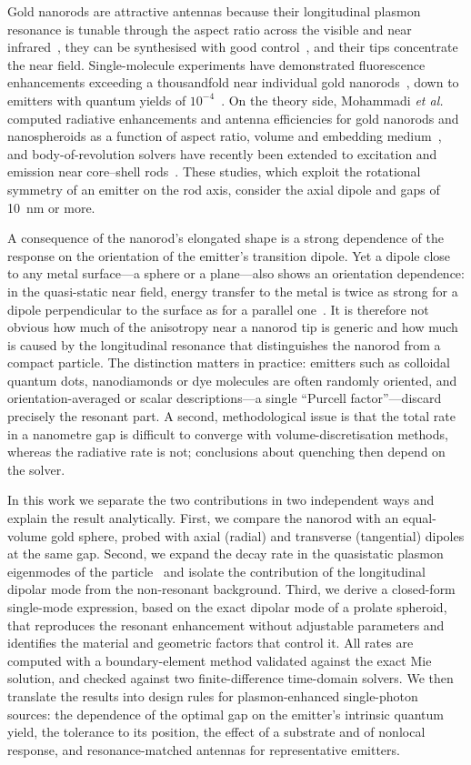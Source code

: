 \documentclass[11pt,a4paper]{article}
\begin{document}
Gold nanorods are attractive antennas because their longitudinal plasmon resonance is tunable through the
aspect ratio across the visible and near infrared~\cite{ni2008,sonnichsen}, they can be synthesised with good
control~\cite{nikoobakht}, and their tips concentrate the near field. Single-molecule experiments have
demonstrated fluorescence enhancements exceeding a thousandfold near individual gold nanorods~\cite{yuan,khatua},
down to emitters with quantum yields of $10^{-4}$~\cite{lu2020}. On the theory side, Mohammadi \emph{et al.}
computed radiative enhancements and antenna efficiencies for gold nanorods and nanospheroids as a function of
aspect ratio, volume and embedding medium~\cite{mohammadi,mohammadi2009}, and body-of-revolution solvers have
recently been extended to excitation and emission near core--shell rods~\cite{ugwuoke2026}. These studies, which
exploit the rotational symmetry of an emitter on the rod axis, consider the axial dipole and gaps of
\SI{10}{nm} or more.

A consequence of the nanorod's elongated shape is a strong dependence of the response on the orientation of the
emitter's transition dipole. Yet a dipole close to any metal surface---a sphere or a plane---also shows an
orientation dependence: in the quasi-static near field, energy transfer to the metal is twice as strong for a
dipole perpendicular to the surface as for a parallel one~\cite{ford}. It is therefore not obvious how much of the
anisotropy near a nanorod tip is generic and how much is caused by the longitudinal resonance that distinguishes
the nanorod from a compact particle. The distinction matters in practice: emitters such as colloidal quantum
dots, nanodiamonds or dye molecules are often randomly oriented, and orientation-averaged or scalar
descriptions---a single ``Purcell factor''---discard precisely the resonant part. A second, methodological issue
is that the total rate in a nanometre gap is difficult to converge with volume-discretisation methods, whereas the
radiative rate is not; conclusions about quenching then depend on the solver.

In this work we separate the two contributions in two independent ways and explain the result analytically. First, we compare the nanorod with an
equal-volume gold sphere, probed with axial (radial) and transverse (tangential) dipoles at the same gap. Second,
we expand the decay rate in the quasistatic plasmon eigenmodes of the particle~\cite{mayergoyz2005} and isolate
the contribution of the longitudinal dipolar mode from the non-resonant background. Third, we derive a closed-form
single-mode expression, based on the exact dipolar mode of a prolate spheroid, that reproduces the resonant
enhancement without adjustable parameters and identifies the material and geometric factors that control it. All rates are computed with a
boundary-element method validated against the exact Mie solution, and checked against two finite-difference
time-domain solvers. We then translate the results into design rules for plasmon-enhanced single-photon sources:
the dependence of the optimal gap on the emitter's intrinsic quantum yield, the tolerance to its position, the
effect of a substrate and of nonlocal response, and resonance-matched antennas for representative emitters.
\end{document}
